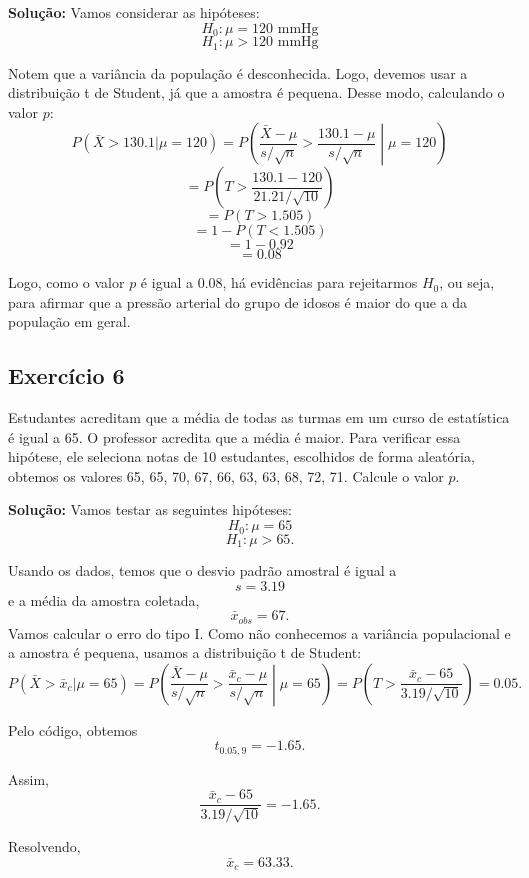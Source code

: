 \documentclass{article}
\begin{document}
\vspace{0.5cm}
\textbf{Solução:}
Vamos considerar as hipóteses:
    $$
    H_0 : \mu = 120 \text{ mmHg}
    $$
    $$
    H_1 : \mu > 120 \text{ mmHg}
    $$ 

Notem que a variância da população é desconhecida. Logo, devemos usar a distribuição t de Student, já que a amostra é pequena. Desse modo, calculando o valor $p$:
    $$
    P(\bar{X} > 130.1|\mu = 120) = P\left(\frac{\bar{X} - \mu}{s/\sqrt{n}} > \frac{130.1 - \mu}{s/\sqrt{n}}\middle|\mu = 120\right)
    $$
    $$
    = P\left(T > \frac{130.1 - 120}{21.21/\sqrt{10}}\right)
    $$
    $$
    = P(T > 1.505)
    $$
    $$
    = 1 - P(T < 1.505)
    $$
    $$
    = 1 - 0.92
    $$
    $$
    = 0.08
    $$

Logo, como o valor $p$ é igual a $0.08$, há evidências para rejeitarmos $H_0$, ou seja, para afirmar que a pressão arterial do grupo de idosos é maior do que a da população em geral.

\subsection{Exercício 6}
Estudantes acreditam que a média de todas as turmas em um curso de estatística é igual a 65. O professor acredita que a média é maior. Para verificar essa hipótese, ele seleciona notas de 10 estudantes, escolhidos de forma aleatória, obtemos os valores 65, 65, 70, 67, 66, 63, 63, 68, 72, 71. Calcule o valor $p$.

\vspace{0.5cm}
\textbf{Solução:}
Vamos testar as seguintes hipóteses:
    $$
    H_0 : \mu = 65
    $$
    $$
    H_1 : \mu > 65.
    $$

Usando os dados, temos que o desvio padrão amostral é igual a 
    $$
    s = 3.19
    $$
e a média da amostra coletada,
    $$
    \bar{x}_{obs} = 67.
    $$
Vamos calcular o erro do tipo I. Como não conhecemos a variância populacional e a amostra é pequena, usamos a distribuição t de Student:
    $$
    P(\bar{X} > \bar{x}_c|\mu = 65) = P\left( \frac{\bar{X} - \mu}{s/\sqrt{n}} > \frac{\bar{x}_c - \mu}{s/\sqrt{n}}\middle|\mu = 65\right) = P\left( T > \frac{\bar{x}_c - 65}{3.19/\sqrt{10}}\right) = 0.05.
    $$

Pelo código, obtemos 
    $$
    t_{0.05, 9} = -1.65.
    $$

Assim,
    $$
    \frac{\bar{x}_c - 65}{3.19/\sqrt{10}} = -1.65.
    $$

Resolvendo,
    $$
    \bar{x}_c = 63.33.
    $$
\end{document}
